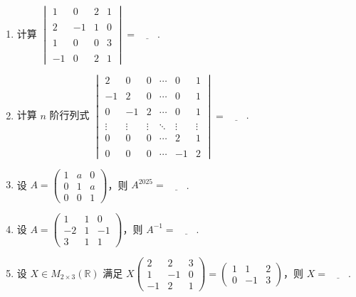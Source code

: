 \begin{enumerate}
    \item 计算 $\begin{vmatrix}
        1 & 0 & 2 & 1 \\ \\
        2 & -1 & 1 & 0 \\ \\
        1 & 0 & 0 & 3 \\ \\
        -1 & 0 & 2 & 1
    \end{vmatrix} = \underline{\qquad}$.

    \item 计算 $n$ 阶行列式 $\begin{vmatrix}
        2 & 0 & 0 & \cdots & 0 & 1 \\ \\
        -1 & 2 & 0 & \cdots & 0 & 1 \\ \\
        0 & -1 & 2 & \cdots & 0 & 1 \\ \\
        \vdots & \vdots & \vdots & \ddots & \vdots & \vdots \\
        0 & 0 & 0 & \cdots & 2 & 1 \\ \\
        0 & 0 & 0 & \cdots & -1 & 2
    \end{vmatrix} = \underline{\qquad}$.

    \item 设 $A = \begin{pmatrix}
        1 & a & 0 \\
        0 & 1 & a \\
        0 & 0 & 1
    \end{pmatrix}$，则 $A^{2025} = \underline{\qquad}$.

    \item 设 $A = \begin{pmatrix}
        1 & 1 & 0 \\
        -2 & 1 & -1 \\
        3 & 1 & 1
    \end{pmatrix}$，则 $A^{-1} = \underline{\qquad}$.

    \item 设 $X \in M_{2 \times 3}(\mathbb{R})$ 满足 $X \begin{pmatrix}
        2 & 2 & 3 \\
        1 & -1 & 0 \\
        -1 & 2 & 1
    \end{pmatrix} = \begin{pmatrix}
        1 & 1 & 2 \\
        0 & -1 & 3
    \end{pmatrix}$，则 $X = \underline{\qquad}$.


\end{enumerate}
